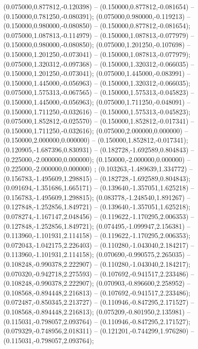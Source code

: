  (0.075000,0.877812,-0.120398) -- (0.150000,0.877812,-0.081654) -- (0.150000,0.781250,-0.080391);
 (0.075000,0.980000,-0.119213) -- (0.150000,0.980000,-0.080850) -- (0.150000,0.877812,-0.081654);
 (0.075000,1.087813,-0.114979) -- (0.150000,1.087813,-0.077979) -- (0.150000,0.980000,-0.080850);
 (0.075000,1.201250,-0.107698) -- (0.150000,1.201250,-0.073041) -- (0.150000,1.087813,-0.077979);
 (0.075000,1.320312,-0.097368) -- (0.150000,1.320312,-0.066035) -- (0.150000,1.201250,-0.073041);
 (0.075000,1.445000,-0.083991) -- (0.150000,1.445000,-0.056963) -- (0.150000,1.320312,-0.066035);
 (0.075000,1.575313,-0.067565) -- (0.150000,1.575313,-0.045823) -- (0.150000,1.445000,-0.056963);
 (0.075000,1.711250,-0.048091) -- (0.150000,1.711250,-0.032616) -- (0.150000,1.575313,-0.045823);
 (0.075000,1.852812,-0.025570) -- (0.150000,1.852812,-0.017341) -- (0.150000,1.711250,-0.032616);
 (0.075000,2.000000,0.000000) -- (0.150000,2.000000,0.000000) -- (0.150000,1.852812,-0.017341);
 (0.120905,-1.687396,0.830931) -- (0.182728,-1.692589,0.804843) -- (0.225000,-2.000000,0.000000);
 (0.150000,-2.000000,0.000000) -- (0.225000,-2.000000,0.000000) ;
 (0.103263,-1.489639,1.334772) -- (0.156783,-1.495609,1.298815) -- (0.182728,-1.692589,0.804843);
 (0.091694,-1.351686,1.665171) -- (0.139640,-1.357051,1.625218) -- (0.156783,-1.495609,1.298815);
 (0.083778,-1.248540,1.891267) -- (0.127848,-1.252856,1.849721) -- (0.139640,-1.357051,1.625218);
 (0.078274,-1.167147,2.048456) -- (0.119622,-1.170295,2.006353) -- (0.127848,-1.252856,1.849721);
 (0.074495,-1.099947,2.156381) -- (0.113960,-1.101931,2.114158) -- (0.119622,-1.170295,2.006353);
 (0.072043,-1.042175,2.226403) -- (0.110280,-1.043040,2.184217) -- (0.113960,-1.101931,2.114158);
 (0.070690,-0.990575,2.265035) -- (0.108248,-0.990378,2.222907) -- (0.110280,-1.043040,2.184217);
 (0.070320,-0.942718,2.275593) -- (0.107692,-0.941517,2.233486) -- (0.108248,-0.990378,2.222907);
 (0.070903,-0.896600,2.258952) -- (0.108568,-0.894448,2.216813) -- (0.107692,-0.941517,2.233486);
 (0.072487,-0.850345,2.213727) -- (0.110946,-0.847295,2.171527) -- (0.108568,-0.894448,2.216813);
 (0.075209,-0.801950,2.135981) -- (0.115031,-0.798057,2.093764) -- (0.110946,-0.847295,2.171527);
 (0.079329,-0.748956,2.018311) -- (0.121201,-0.744299,1.976280) -- (0.115031,-0.798057,2.093764);
